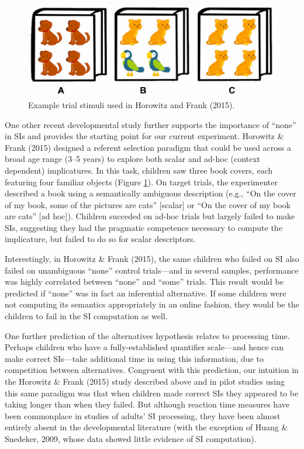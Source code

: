 \documentclass[10pt, letterpaper]{article}
\newenvironment{CodeChunk}{}{}
\begin{document}
\begin{CodeChunk}
\begin{figure}[b]

{\centering \includegraphics{figs/image-1} 

}

\caption[Example trial stimuli used in Horowitz and Frank (2015)]{Example trial stimuli used in Horowitz and Frank (2015).}\label{fig:image}
\end{figure}
\end{CodeChunk}

One other recent developmental study further supports the importance of
``none'' in SIs and provides the starting point for our current
experiment. Horowitz \& Frank (2015) designed a referent selection
paradigm that could be used across a broad age range (3--5 years) to
explore both scalar and ad-hoc (context dependent) implicatures. In this
task, children saw three book covers, each featuring four familiar
objects (Figure \ref{fig:image}). On target trials, the experimenter
described a book using a semantically ambiguous description (e.g., ``On
the cover of my book, some of the pictures are cats'' {[}scalar{]} or
``On the cover of my book are cats'' {[}ad hoc{]}). Children succeded on
ad-hoc trials but largely failed to make SIs, suggesting they had the
pragmatic competence necessary to compute the implicature, but failed to
do so for scalar descriptors.

Interestingly, in Horowitz \& Frank (2015), the same children who failed
on SI also failed on unambiguous ``none'' control trials---and in
several samples, performance was highly correlated between ``none'' and
``some'' trials. This result would be predicted if ``none'' was in fact
an inferential alternative. If some children were not computing its
semantics appropriately in an online fashion, they would be the children
to fail in the SI computation as well.

One further prediction of the alternatives hypothesis relates to
processing time. Perhaps children who have a fully-established
quantifier scale---and hence can make correct SIs---take additional time
in using this information, due to competition between alternatives.
Congruent with this prediction, our intuition in the Horowitz \& Frank
(2015) study described above and in pilot studies using this same
paradigm was that when children made correct SIs they appeared to be
taking longer than when they failed. But although reaction time measures
have been commonplace in studies of adults' SI processing, they have
been almost entirely absent in the developmental literature (with the
exception of Huang \& Snedeker, 2009, whose data showed little evidence
of SI computation).
\end{document}
